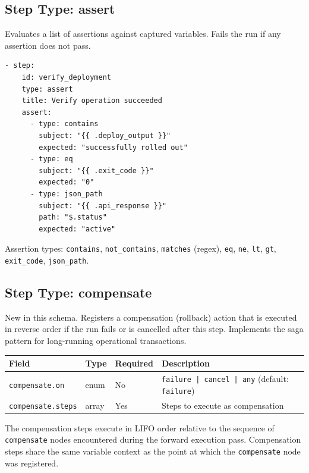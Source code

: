 \subsection{Step Type: assert}
\label{subsec:step-assert}

Evaluates a list of assertions against captured variables.  Fails the run if
any assertion does not pass.

\begin{verbatim}
- step:
    id: verify_deployment
    type: assert
    title: Verify operation succeeded
    assert:
      - type: contains
        subject: "{{ .deploy_output }}"
        expected: "successfully rolled out"
      - type: eq
        subject: "{{ .exit_code }}"
        expected: "0"
      - type: json_path
        subject: "{{ .api_response }}"
        path: "$.status"
        expected: "active"
\end{verbatim}

Assertion types: \texttt{contains}, \texttt{not\_contains}, \texttt{matches}
(regex), \texttt{eq}, \texttt{ne}, \texttt{lt}, \texttt{gt}, \texttt{exit\_code},
\texttt{json\_path}.

\subsection{Step Type: compensate}
\label{subsec:step-compensate}

New in this schema.  Registers a compensation (rollback) action that is executed in
reverse order if the run fails or is cancelled after this step.  Implements the
saga pattern for long-running operational transactions.

\begin{center}
\begin{tabular}{lllp{5cm}}
\hline
\textbf{Field} & \textbf{Type} & \textbf{Required} & \textbf{Description} \\
\hline
\texttt{compensate.on}   & enum  & No  & \texttt{failure | cancel | any} (default: \texttt{failure}) \\
\texttt{compensate.steps}& array & Yes & Steps to execute as compensation \\
\hline
\end{tabular}
\end{center}

The compensation steps execute in LIFO order relative to the sequence of
\texttt{compensate} nodes encountered during the forward execution pass.
Compensation steps share the same variable context as the point at which the
\texttt{compensate} node was registered.

